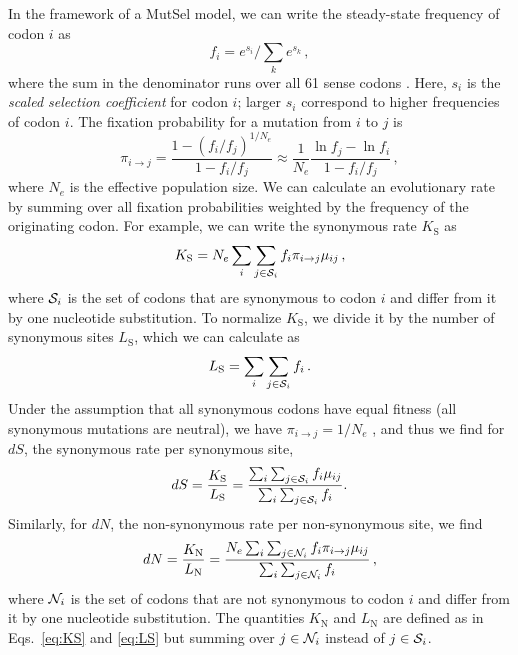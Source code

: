 \documentclass[11pt]{article}
\begin{document}
In the framework of a MutSel model, we can write the steady-state frequency of codon $i$ as
\begin{equation}\label{eq:fi}
 f_i=e^{s_i}\Big/\sum_k e^{s_k}\,,
\end{equation}
where the sum in the denominator runs over all 61 sense codons \cite{SellaHirsh2005}. Here, $s_i$ is the \emph{scaled selection coefficient} for codon $i$; larger $s_i$ correspond to higher frequencies of codon $i$. The fixation probability for a mutation from $i$ to $j$ is \cite{HalpernBruno1998,SellaHirsh2005}
\begin{equation}
  \pi_{i\rightarrow j} = \frac{1-(f_i/f_j)^{1/N_e}}{1-f_i/f_j}
  \approx \frac{1}{N_e} \frac{\ln f_j - \ln f_i}{1-f_i/f_j}\,,
\end{equation}
where $N_e$ is the effective population size. We can calculate an evolutionary rate by summing over all fixation probabilities weighted by the frequency of the originating codon. For example, we can write the synonymous rate $K_\text{S}$ as
\begin{equation}\label{eq:KS}
  K_\text{S} = N_e \sum_i \sum_{j \in {\cal S}_i} f_i  \pi_{i\rightarrow j}\mu_{ij}\,,
\end{equation}
where ${\cal S}_i$ is the set of codons that are synonymous to codon $i$ and differ from it by one nucleotide substitution. To normalize $K_\text{S}$, we divide it by the number of synonymous sites $L_\text{S}$, which we can calculate as 
\begin{equation}\label{eq:LS}
  L_\text{S} = \sum_i \sum_{j \in {\cal S}_i} f_i \,.
\end{equation}
Under the assumption that all synonymous codons have equal fitness (all synonymous mutations are neutral), we have $\pi_{i\rightarrow j}=1/N_e$ \cite{CrowKimura1970}, and thus we find for $dS$, the synonymous rate per synonymous site,
\begin{equation}\label{eq:dS}
  dS = \frac{K_\text{S}}{L_\text{S}}= \frac{\sum_i \sum_{j \in {\cal S}_i} f_i\mu_{ij}}{\sum_i \sum_{j \in {\cal S}_i} f_i}.
\end{equation}
Similarly, for $dN$, the non-synonymous rate per non-synonymous site, we find
\begin{equation}\label{eq:dN}
  dN = \frac{K_\text{N}}{L_\text{N}}=\frac{ N_e \sum_i \sum_{j \in {\cal N}_i} f_i  \pi_{i\rightarrow j}\mu_{ij}}{\sum_i \sum_{j \in {\cal N}_i} f_i}\,,
\end{equation}
where ${\cal N}_i$ is the set of codons that are not synonymous to codon $i$ and differ from it by one nucleotide substitution. The quantities $K_\text{N}$ and $L_\text{N}$ are defined as in Eqs.~\eqref{eq:KS} and \eqref{eq:LS} but summing over $j\in {\cal N}_i$ instead of $j\in {\cal S}_i$.
\end{document}
